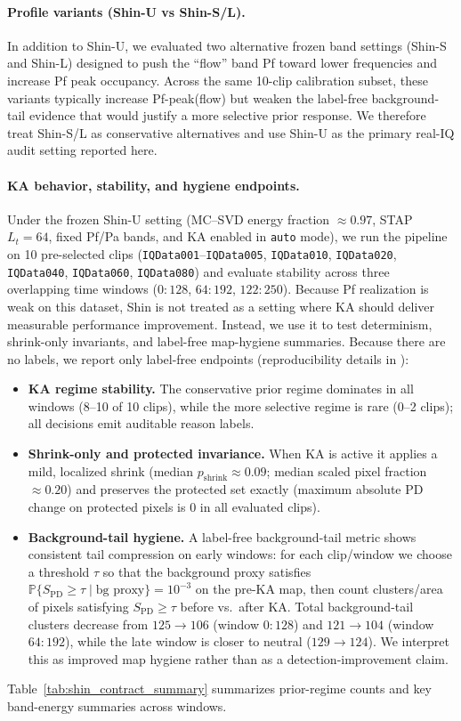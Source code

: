 \paragraph{Profile variants (Shin-U vs Shin-S/L).}
In addition to Shin-U, we evaluated two alternative frozen band settings (Shin-S and Shin-L) designed to push the ``flow'' band Pf toward lower frequencies and increase Pf peak occupancy. Across the same 10-clip calibration subset, these variants typically increase Pf-peak(flow) but weaken the label-free background-tail evidence that would justify a more selective prior response. We therefore treat Shin-S/L as conservative alternatives and use Shin-U as the primary real-IQ audit setting reported here.

\paragraph{KA behavior, stability, and hygiene endpoints.}
Under the frozen Shin-U setting (MC--SVD energy fraction $\approx 0.97$, STAP $L_t=64$, fixed Pf/Pa bands, and KA enabled in \texttt{auto} mode), we run the pipeline on 10 pre-selected clips (\texttt{IQData001}--\texttt{IQData005}, \texttt{IQData010}, \texttt{IQData020}, \texttt{IQData040}, \texttt{IQData060}, \texttt{IQData080}) and evaluate stability across three overlapping time windows ($0{:}128$, $64{:}192$, $122{:}250$). Because Pf realization is weak on this dataset, Shin is not treated as a setting where KA should deliver measurable performance improvement. Instead, we use it to test determinism, shrink-only invariants, and label-free map-hygiene summaries. Because there are no labels, we report only label-free endpoints (reproducibility details in ):
\begin{itemize}[nosep]
  \item \textbf{KA regime stability.} The conservative prior regime dominates in all windows (8--10 of 10 clips), while the more selective regime is rare (0--2 clips); all decisions emit auditable reason labels.
  \item \textbf{Shrink-only and protected invariance.} When KA is active it applies a mild, localized shrink (median $p_{\mathrm{shrink}}\approx 0.09$; median scaled pixel fraction $\approx 0.20$) and preserves the protected set exactly (maximum absolute PD change on protected pixels is $0$ in all evaluated clips).
  \item \textbf{Background-tail hygiene.} A label-free background-tail metric shows consistent tail compression on early windows: for each clip/window we choose a threshold $\tau$ so that the background proxy satisfies $\mathbb{P}\{S_{\mathrm{PD}}\ge\tau\mid \text{bg proxy}\}=10^{-3}$ on the pre-KA map, then count clusters/area of pixels satisfying $S_{\mathrm{PD}}\ge\tau$ before vs.\ after KA. Total background-tail clusters decrease from $125\rightarrow 106$ (window $0{:}128$) and $121\rightarrow 104$ (window $64{:}192$), while the late window is closer to neutral ($129\rightarrow 124$). We interpret this as improved map hygiene rather than as a detection-improvement claim.
\end{itemize}
Table~\ref{tab:shin_contract_summary} summarizes prior-regime counts and key band-energy summaries across windows.

